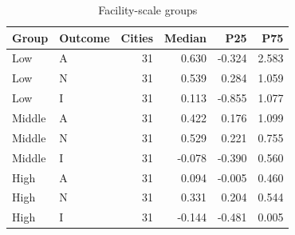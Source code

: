 \begin{table}[htbp]\centering\small
\caption{Facility-scale groups}\label{tab:si_size}
\begin{tabular}{@{}llrrrr@{}}
\toprule
Group & Outcome & Cities & Median & P25 & P75 \\\midrule
Low & A & 31 & 0.630 & -0.324 & 2.583 \\
Low & N & 31 & 0.539 & 0.284 & 1.059 \\
Low & I & 31 & 0.113 & -0.855 & 1.077 \\
Middle & A & 31 & 0.422 & 0.176 & 1.099 \\
Middle & N & 31 & 0.529 & 0.221 & 0.755 \\
Middle & I & 31 & -0.078 & -0.390 & 0.560 \\
High & A & 31 & 0.094 & -0.005 & 0.460 \\
High & N & 31 & 0.331 & 0.204 & 0.544 \\
High & I & 31 & -0.144 & -0.481 & 0.005 \\
\bottomrule\end{tabular}
\end{table}
